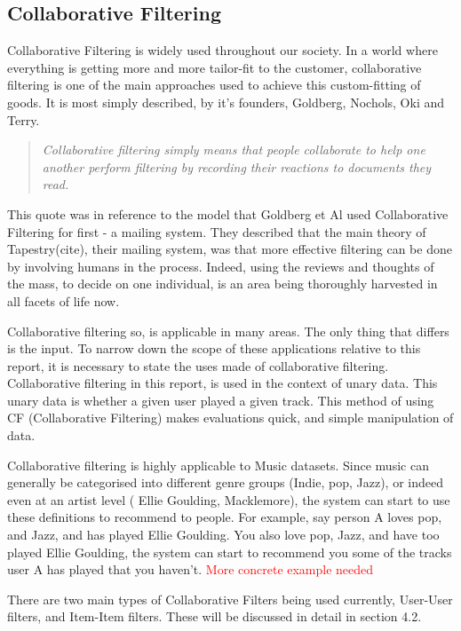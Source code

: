 \documentclass[12pt]{article}
\newcommand\todo[1]{\textcolor{red}{#1}}
\begin{document}
	\subsection{Collaborative Filtering}
Collaborative Filtering is widely used throughout our society. In a world where everything is getting more and more tailor-fit to the customer, collaborative filtering is one of the main approaches used to achieve this custom-fitting of goods. It is most simply described, by it's founders, Goldberg, Nochols, Oki and Terry. \cite{goldberg1992using}


\begin{quote}
\textit{Collaborative filtering simply means that people 
collaborate to help one another perform filtering by 
recording their reactions to documents they read.}
\end{quote}


This quote was in reference to the model that Goldberg et Al used Collaborative Filtering for first - a mailing system. They described  that the main theory of Tapestry(cite), their mailing system, was that more effective filtering can be done by involving humans in the process. Indeed, using the reviews and thoughts of the mass, to decide on one individual, is an area being thoroughly harvested in all facets of life now. 

Collaborative filtering so, is applicable in many areas. The only thing that differs is the input. To narrow down the scope of these applications relative to this report, it is necessary to state the uses made of collaborative filtering. Collaborative filtering in this report, is used in the context of unary data. This unary data is whether a given user played a given track. This method of using CF (Collaborative Filtering) makes evaluations quick, and simple manipulation of data.

Collaborative filtering is highly applicable to Music datasets. 
Since music can generally be categorised into different genre groups (Indie, pop, Jazz), or indeed even at an artist level ( Ellie Goulding, Macklemore), the system can start to use these definitions to recommend to people. For example, say person A loves pop, and Jazz, and has played Ellie Goulding. You also love pop, Jazz, and have too played Ellie Goulding, the system can start to recommend you some of the tracks user A has played that you haven't. 
\todo{ More concrete example needed}


There are two main types of Collaborative Filters being used currently, User-User filters, and Item-Item filters. These will be discussed in detail in section 4.2.
\end{document}
